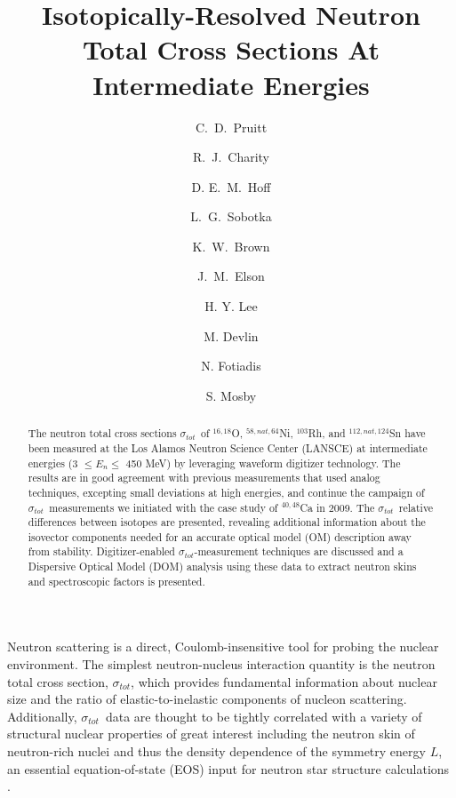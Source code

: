 \documentclass[twocolumn,secnumarabic,amssymb, nobibnotes, aps, prl,
superscriptaddress, nobalancelastpage]{revtex4}
\newcommand{\tot}{\ensuremath{\sigma_{tot}}}
\begin{document}
\begin{abstract}
    The neutron total cross sections \tot\ of $^{16,18}$O,
    $^{58,nat,64}$Ni, $^{103}$Rh, and $^{112,nat,124}$Sn have been measured at the Los Alamos
    Neutron Science Center (LANSCE) at intermediate energies (3 $\leq E_{n}
    \leq$ 450 MeV) by
    leveraging waveform digitizer technology. The results are in good agreement
    with previous measurements that used analog techniques,
    excepting small deviations at high energies, and continue the campaign of
    \tot\ measurements we initiated with the case study of $^{40,48}$Ca in 2009.
    The \tot\ relative differences between isotopes are presented,
    revealing additional information about
    the isovector components needed for an accurate optical model (OM)
    description away from stability. Digitizer-enabled \tot-measurement
    techniques are discussed and a Dispersive Optical Model (DOM)
    analysis using these data to extract neutron skins and spectroscopic factors
    is presented.
\end{abstract}

\title{Isotopically-Resolved Neutron Total Cross Sections At
Intermediate Energies}

\author{C.~D.~Pruitt}  
\author{R.~J.~Charity}
\author{D. E.~M.~Hoff}  
\author{L.~G.~Sobotka}
\author{K.~W.~Brown} 
\author{J.~M.~Elson}

\author{H. Y. Lee}
\author{M. Devlin}
\author{N. Fotiadis}
\author{S. Mosby}
\maketitle

Neutron scattering is a direct, Coulomb-insensitive tool for probing the nuclear
environment. The simplest neutron-nucleus interaction quantity is 
the neutron total cross section, \tot, which provides fundamental information about
nuclear size and the ratio of elastic-to-inelastic components of nucleon 
scattering. Additionally, \tot\ data are thought to be tightly correlated with
a variety of structural nuclear properties of great interest
including the neutron skin of neutron-rich nuclei
\cite{Mahzoon2017} and thus the density dependence of the symmetry energy $L$,
an essential equation-of-state (EOS) input for neutron star
structure calculations \cite{Fattoyev2012, Vinas2014, Brown2000}.
\end{document}

